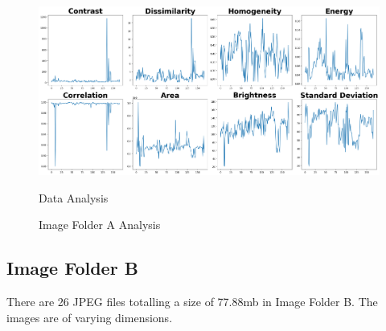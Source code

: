 \begin{figure}[ht]
\begin{minipage}[t]{0.50\textwidth}
        \centering
        \includegraphics[width=\textwidth]{Figures/EDA_Charts/2/da.png}
        \caption*{Data Analysis}
    \end{minipage}
    \caption{Image Folder A Analysis}
    \label{fig:Image Folder A Analysis}
\end{figure}

\subsection{Image Folder B}

There are 26 JPEG files totalling a size of 77.88mb in Image Folder B. The images are of varying dimensions.

